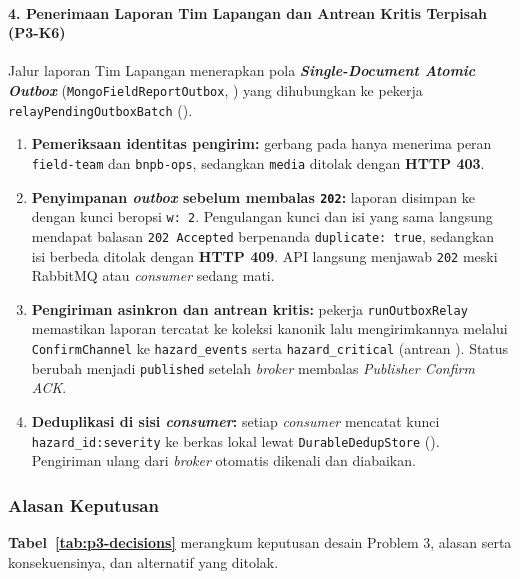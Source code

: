 \paragraph*{4. Penerimaan Laporan Tim Lapangan dan Antrean Kritis Terpisah (P3-K6)}
Jalur laporan Tim Lapangan menerapkan pola \textbf{\textit{Single-Document Atomic Outbox}} (\texttt{Mongo\allowbreak Field\allowbreak Report\allowbreak Outbox}, ) yang dihubungkan ke pekerja \texttt{relay\allowbreak Pending\allowbreak Outbox\allowbreak Batch} ().

\begin{enumerate}
  \item \textbf{Pemeriksaan identitas pengirim:} gerbang pada  hanya menerima peran \texttt{field-team} dan \texttt{bnpb-ops}, sedangkan \texttt{media} ditolak dengan \textbf{HTTP 403}.
  \item \textbf{Penyimpanan \textit{outbox} sebelum membalas \texttt{202}:} laporan disimpan ke  dengan kunci  beropsi \texttt{w: 2}. Pengulangan kunci dan isi yang sama langsung mendapat balasan \texttt{202 Accepted} berpenanda \texttt{duplicate: true}, sedangkan isi berbeda ditolak dengan \textbf{HTTP 409}. API langsung menjawab \texttt{202} meski RabbitMQ atau \textit{consumer} sedang mati.
  \item \textbf{Pengiriman asinkron dan antrean kritis:} pekerja \texttt{runOutboxRelay} memastikan laporan tercatat ke koleksi kanonik lalu mengirimkannya melalui \texttt{ConfirmChannel} ke \texttt{hazard\_events} serta \texttt{hazard\_critical} (antrean ). Status berubah menjadi \texttt{published} setelah \textit{broker} membalas \textit{Publisher Confirm ACK}.
  \item \textbf{Deduplikasi di sisi \textit{consumer}:} setiap \textit{consumer} mencatat kunci \texttt{hazard\_id:severity} ke berkas lokal lewat \texttt{DurableDedupStore} (). Pengiriman ulang dari \textit{broker} otomatis dikenali dan diabaikan.
\end{enumerate}

\subsubsection{Alasan Keputusan}

\textbf{Tabel~\ref{tab:p3-decisions}} merangkum keputusan desain Problem 3, alasan serta konsekuensinya, dan alternatif yang ditolak.

